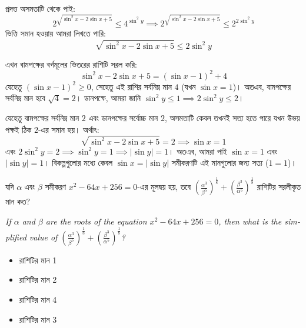 \documentclass[12pt, a4paper]{article}
\begin{document}
\begin{tcolorbox}[solutionbox={সমাধান (Solution)}]
    \noindent
    প্রদত্ত অসমতাটি থেকে পাই:
    \[ 2^{\sqrt{\sin^2 x - 2\sin x + 5}} \le 4^{\sin^2 y} \implies 2^{\sqrt{\sin^2 x - 2\sin x + 5}} \le 2^{2\sin^2 y} \]
    ভিত্তি সমান হওয়ায় আমরা লিখতে পারি:
    \[ \sqrt{\sin^2 x - 2\sin x + 5} \le 2\sin^2 y \]
    
    \vspace{0.5em}
    এখন বামপক্ষের বর্গমূলের ভিতরের রাশিটি সরল করি:
    \[ \sin^2 x - 2\sin x + 5 = (\sin x - 1)^2 + 4 \]
    যেহেতু $(\sin x - 1)^2 \ge 0$, সেহেতু এই রাশির সর্বনিম্ন মান $4$ (যখন $\sin x = 1$)। অতএব, বামপক্ষের সর্বনিম্ন মান হবে $\sqrt{4} = 2$।
    ডানপক্ষে, আমরা জানি $\sin^2 y \le 1 \implies 2\sin^2 y \le 2$।
    
    \vspace{0.5em}
    যেহেতু বামপক্ষের সর্বনিম্ন মান $2$ এবং ডানপক্ষের সর্বোচ্চ মান $2$, অসমতাটি কেবল তখনই সত্য হতে পারে যখন উভয় পক্ষই ঠিক $2$-এর সমান হয়। অর্থাৎ:
    \[ \sqrt{\sin^2 x - 2\sin x + 5} = 2 \implies \sin x = 1 \]
    এবং $2\sin^2 y = 2 \implies \sin^2 y = 1 \implies |\sin y| = 1$।
    অতএব, আমরা পাই $\sin x = 1$ এবং $|\sin y| = 1$। বিকল্পগুলোর মধ্যে কেবল $\sin x = |\sin y|$ সমীকরণটি এই মানগুলোর জন্য সত্য ($1 = 1$)।
\end{tcolorbox}
\begin{tcolorbox}[questionbox={প্রশ্ন (Question) 30}]
    \noindent
    যদি $\alpha$ এবং $\beta$ সমীকরণ $x^2 - 64x + 256 = 0$-এর মূলদ্বয় হয়, তবে $\left(\frac{\alpha^3}{\beta^5}\right)^{\frac{1}{8}} + \left(\frac{\beta^3}{\alpha^5}\right)^{\frac{1}{8}}$ রাশিটির সরলীকৃত মান কত?
    
    \vspace{0.8em}
    \begin{english}
    \noindent\textit{\color{darkgray}
    If $\alpha$ and $\beta$ are the roots of the equation $x^2 - 64x + 256 = 0$, then what is the simplified value of $\left(\frac{\alpha^3}{\beta^5}\right)^{\frac{1}{8}} + \left(\frac{\beta^3}{\alpha^5}\right)^{\frac{1}{8}}$?
    }
    \end{english}
\end{tcolorbox}

\begin{itemize}[label={}, leftmargin=1cm, itemsep=0.5em]
    \item[\textbf{A)}] রাশিটির মান 1
    \item[\textbf{B)}] রাশিটির মান 2
    \item[\textbf{C)}] রাশিটির মান 4
    \item[\textbf{D)}] রাশিটির মান 3
\end{itemize}
\end{document}
